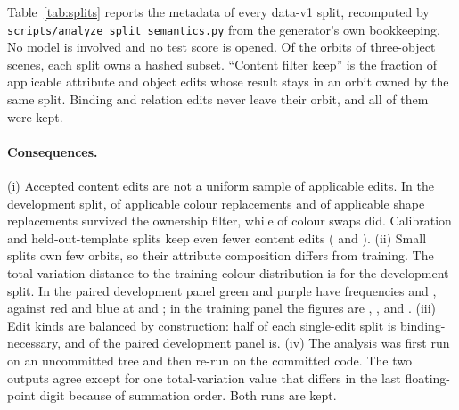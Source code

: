 Table~\ref{tab:splits} reports the metadata of every data-v1 split, recomputed by
\texttt{scripts/analyze\_split\_semantics.py} from the generator's own bookkeeping. No model is
involved and no test score is opened. Of the \SSorbitsTotal{} orbits of three-object scenes, each
split owns a hashed subset. ``Content filter keep'' is the fraction of applicable attribute and
object edits whose result stays in an orbit owned by the same split. Binding and relation edits
never leave their orbit, and all of them were kept.

\begin{table}[h]
\caption{Data-v1 split metadata (source:
\url{runs/split_semantics_v1_20260926T230848Z/split_semantics.json}). ``Attempts'' counts every
proposal, including rejected base scenes; ``accept'' is groups divided by attempts; ``orbits'' is
orbits owned, ``used'' orbits occurring in the split; ``keep'' is the content-edit filter keep rate;
\bn{} is the binding-necessary share.}
\label{tab:splits}
\centering\footnotesize

\end{table}

\paragraph{Consequences.}
(i) Accepted content edits are not a uniform sample of applicable edits. In the development split,
\SSDevReplColorKept{} of \SSDevReplColorAppl{} applicable colour replacements and
\SSDevReplShapeKept{} of \SSDevReplShapeAppl{} applicable shape replacements survived the
ownership filter, while \SSDevSwapColorKept{} of \SSDevSwapColorAppl{} colour swaps did.
Calibration and held-out-template splits keep even fewer content edits (\SSCalibContentFilter{} and
\SSHeldTemplateContentFilter). (ii) Small splits own few orbits, so their attribute composition
differs from training. The total-variation distance to the training colour distribution is
\SSDevTVColor{} for the development split. In the paired development panel green and purple have
frequencies \SSpanelDevColorGreen{} and \SSpanelDevColorPurple{}, against red and blue at
\SSpanelDevColorRed{} and \SSpanelDevColorBlue{}; in the training panel the figures are
\SSpanelTrainColorGreen{}, \SSpanelTrainColorPurple{}, \SSpanelTrainColorRed{} and
\SSpanelTrainColorBlue. (iii) Edit kinds are balanced by construction: half of each single-edit
split is binding-necessary, and \SSpanelDevBN{} of the paired development panel is. (iv) The
analysis was first run on an uncommitted tree and then re-run on the committed code. The two
outputs agree except for one total-variation value that differs in the last floating-point digit
because of summation order. Both runs are kept.
